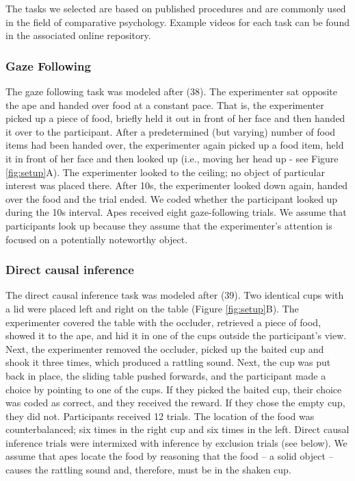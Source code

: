 \documentclass[
  man,floatsintext]{apa6}
\begin{document}
The tasks we selected are based on published procedures and are commonly used in the field of comparative psychology. Example videos for each task can be found in the associated online repository.

\hypertarget{gaze-following}{%
\subsubsection{Gaze Following}\label{gaze-following}}

The gaze following task was modeled after (38). The experimenter sat opposite the ape and handed over food at a constant pace. That is, the experimenter picked up a piece of food, briefly held it out in front of her face and then handed it over to the participant. After a predetermined (but varying) number of food items had been handed over, the experimenter again picked up a food item, held it in front of her face and then looked up (i.e., moving her head up - see Figure \ref{fig:setup}A). The experimenter looked to the ceiling; no object of particular interest was placed there. After 10s, the experimenter looked down again, handed over the food and the trial ended. We coded whether the participant looked up during the 10s interval. Apes received eight gaze-following trials. We assume that participants look up because they assume that the experimenter's attention is focused on a potentially noteworthy object.

\hypertarget{direct-causal-inference}{%
\subsubsection{Direct causal inference}\label{direct-causal-inference}}

The direct causal inference task was modeled after (39). Two identical cups with a lid were placed left and right on the table (Figure \ref{fig:setup}B). The experimenter covered the table with the occluder, retrieved a piece of food, showed it to the ape, and hid it in one of the cups outside the participant's view. Next, the experimenter removed the occluder, picked up the baited cup and shook it three times, which produced a rattling sound. Next, the cup was put back in place, the sliding table pushed forwards, and the participant made a choice by pointing to one of the cups. If they picked the baited cup, their choice was coded as correct, and they received the reward. If they chose the empty cup, they did not. Participants received 12 trials. The location of the food was counterbalanced; six times in the right cup and six times in the left. Direct causal inference trials were intermixed with inference by exclusion trials (see below). We assume that apes locate the food by reasoning that the food -- a solid object -- causes the rattling sound and, therefore, must be in the shaken cup.
\end{document}
